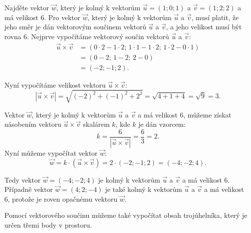 \begin{example}
    Najděte vektor $\vec{w}$, který je kolmý k vektorům $\vec{u} = (1;0;1)$ a $\vec{v} = (1;2;2)$ a má velikost 6.
    Pro vektor $\vec{w}$, který je kolmý k vektorům $\vec{u}$ a $\vec{v}$, musí platit, že jeho směr je dán vektorovým součinem vektorů $\vec{u}$ a $\vec{v}$, a jeho velikost musí být rovna 6.
    Nejprve vypočítáme vektorový součin vektorů $\vec{u}$ a $\vec{v}$:
    \begin{align*}
        \vec{u} \times \vec{v} &= (0 \cdot 2 - 1 \cdot 2;\, 1 \cdot 1 - 1 \cdot 2;\, 1 \cdot 2 - 0 \cdot 1)\\
                                &= (0 - 2;\, 1 - 2;\, 2 - 0)\\
                                &= (-2; -1; 2).
    \end{align*}

    Nyní vypočítáme velikost vektoru $\vec{u} \times \vec{v}$:
    \[
        |\vec{u} \times \vec{v}| = \sqrt{(-2)^2 + (-1)^2 + 2^2} = \sqrt{4 + 1 + 4} = \sqrt{9} = 3.
    \]

    Vektor $\vec{w}$, který je kolmý k vektorům $\vec{u}$ a $\vec{v}$ a má velikost 6, můžeme získat násobením vektoru $\vec{u} \times \vec{v}$ skalárem $k$, kde $k$ je dán vzorcem:
    \[
        k = \frac{6}{|\vec{u} \times \vec{v}|} = \frac{6}{3} = 2.
    \]
    Nyní můžeme vypočítat vektor $\vec{w}$:
    \[
        \vec{w} = k \cdot (\vec{u} \times \vec{v}) = 2 \cdot (-2; -1; 2) = (-4; -2; 4).
    \]

    Tedy vektor $\vec{w} = (-4; -2; 4)$ je kolmý k vektorům $\vec{u}$ a $\vec{v}$ a má velikost 6.
    Případně vektor $\vec{w} = (4; 2; -4)$ je také kolmý k vektorům $\vec{u}$ a $\vec{v}$ a má velikost 6, protože je roven opačnému vektoru $\vec{w}$.
\end{example}


Pomocí vektorového součinu můžeme také vypočítat obsah trojúhelníka, 
který je určen třemi body v prostoru.

